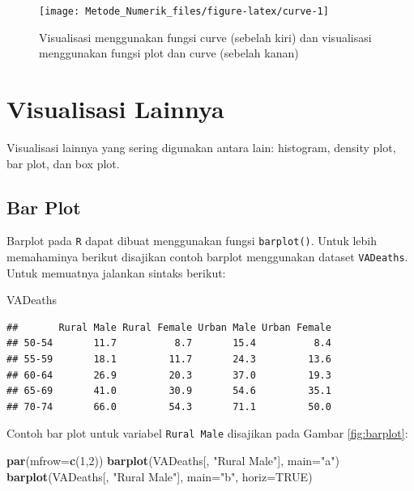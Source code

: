 \documentclass[
]{book}
\newenvironment{Shaded}{\begin{snugshade}}{\end{snugshade}}
\newcommand{\AttributeTok}[1]{\textcolor[rgb]{0.13,0.29,0.53}{#1}}
\newcommand{\ConstantTok}[1]{\textcolor[rgb]{0.56,0.35,0.01}{#1}}
\newcommand{\DecValTok}[1]{\textcolor[rgb]{0.00,0.00,0.81}{#1}}
\newcommand{\FunctionTok}[1]{\textcolor[rgb]{0.13,0.29,0.53}{\textbf{#1}}}
\newcommand{\NormalTok}[1]{#1}
\newcommand{\StringTok}[1]{\textcolor[rgb]{0.31,0.60,0.02}{#1}}
\theoremstyle{definition}
\theoremstyle{definition}
\theoremstyle{definition}
\theoremstyle{definition}
\theoremstyle{remark}
\begin{document}
\begin{figure}

{\centering \texttt{[image: Metode\_Numerik\_files/figure-latex/curve-1]} 

}

\caption{Visualisasi menggunakan fungsi curve (sebelah kiri) dan visualisasi menggunakan fungsi plot dan curve (sebelah kanan)}\label{fig:curve}
\end{figure}

\hypertarget{otherviz}{%
\section{Visualisasi Lainnya}\label{otherviz}}

Visualisasi lainnya yang sering digunakan antara lain: histogram, density plot, bar plot, dan box plot.

\hypertarget{barplot}{%
\subsection{Bar Plot}\label{barplot}}

Barplot pada \texttt{R} dapat dibuat menggunakan fungsi \texttt{barplot()}. Untuk lebih memahaminya berikut disajikan contoh barplot menggunakan dataset \texttt{VADeaths}. Untuk memuatnya jalankan sintaks berikut:

\begin{Shaded}
\begin{Highlighting}[]
\NormalTok{VADeaths}
\end{Highlighting}
\end{Shaded}

\begin{verbatim}
##       Rural Male Rural Female Urban Male Urban Female
## 50-54       11.7          8.7       15.4          8.4
## 55-59       18.1         11.7       24.3         13.6
## 60-64       26.9         20.3       37.0         19.3
## 65-69       41.0         30.9       54.6         35.1
## 70-74       66.0         54.3       71.1         50.0
\end{verbatim}

Contoh bar plot untuk variabel \texttt{Rural\ Male} disajikan pada Gambar \ref{fig:barplot}:

\begin{Shaded}
\begin{Highlighting}[]
\FunctionTok{par}\NormalTok{(}\AttributeTok{mfrow=}\FunctionTok{c}\NormalTok{(}\DecValTok{1}\NormalTok{,}\DecValTok{2}\NormalTok{))}
\FunctionTok{barplot}\NormalTok{(VADeaths[, }\StringTok{"Rural Male"}\NormalTok{], }\AttributeTok{main=}\StringTok{"a"}\NormalTok{)}
\FunctionTok{barplot}\NormalTok{(VADeaths[, }\StringTok{"Rural Male"}\NormalTok{], }\AttributeTok{main=}\StringTok{"b"}\NormalTok{, }\AttributeTok{horiz=}\ConstantTok{TRUE}\NormalTok{)}
\end{Highlighting}
\end{Shaded}
\end{document}
